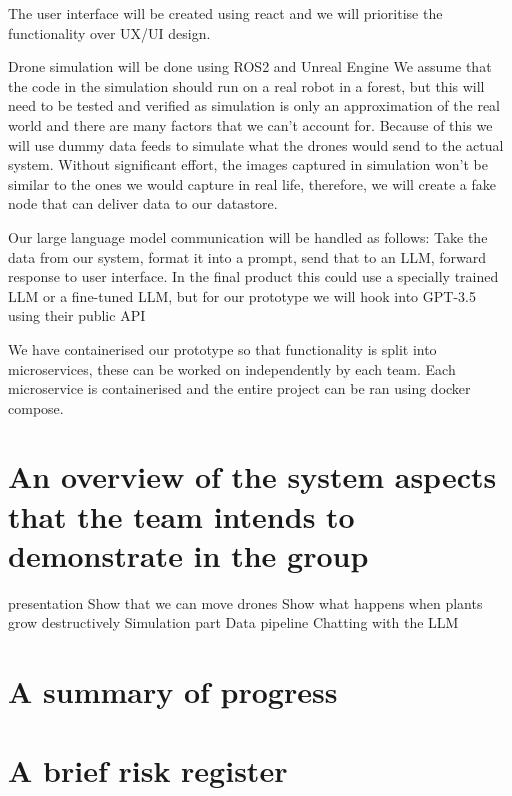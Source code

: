 \documentclass{article}
\begin{document}
The user interface will be created using react and we will prioritise the functionality over UX/UI design. 

Drone simulation will be done using ROS2 and Unreal Engine %
We assume that the code in the simulation should run on a real robot in a forest, but this will need to be tested and verified as simulation is only an approximation of the real world and there are many factors that we can't account for.
Because of this we will use dummy data feeds to simulate what the drones would send to the actual system.
Without significant effort, the images captured in simulation won't be similar to the ones we would capture in real life, therefore, we will create a fake node that can deliver data to our datastore.

Our large language model communication will be handled as follows: Take the data from our system, format it into a prompt, send that to an LLM, forward response to user interface.
In the final product this could use a specially trained LLM or a fine-tuned LLM, but for our prototype we will hook into GPT-3.5 using their public API %

We have containerised our prototype so that functionality is split into microservices, these can be worked on independently by each team.
Each microservice is containerised and the entire project can be ran using docker compose.

\section{An overview of the system aspects that the team intends to demonstrate in the group}
presentation
    Show that we can move drones
    Show what happens when plants grow destructively
        Simulation part
        Data pipeline 
    Chatting with the LLM


\section{A summary of progress}


\section{A brief risk register}
\end{document}

